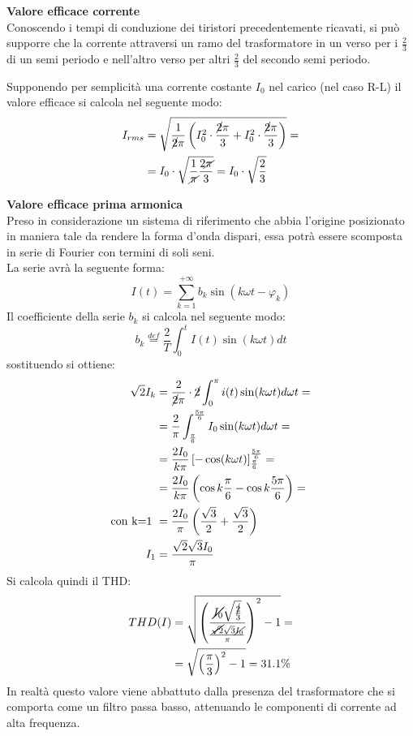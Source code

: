 \documentclass[a4paper,11pt]{article}
\begin{document}
\textbf{Valore efficace corrente}\\
Conoscendo i tempi di conduzione dei tiristori precedentemente ricavati, si può 
supporre che la corrente attraversi un ramo del trasformatore in un verso per i 
\(\frac{2}{3}\) di un semi periodo e nell'altro verso per altri \(\frac{2}{3}\)
del secondo semi periodo.

Supponendo per semplicità una corrente costante \(I_0\) nel carico (nel caso R-L) il valore
efficace si calcola nel seguente modo:
\begin{align*}
 I_{rms} &= \sqrt{\frac{1}{\cancel2\pi}\left(I_0^2\cdot\frac{\cancel2\pi}{3}+I_0^2\cdot
 \frac{\cancel2\pi}{3} \right)}=\\
 &=I_0\cdot\sqrt{\frac{1}{\cancel{\pi}}\frac{2\cancel{\pi}}{3}} = I_0\cdot\sqrt{\frac{2}{3}}
\end{align*}
\smallskip

\textbf{Valore efficace prima armonica}\\
Preso in considerazione un sistema di riferimento che abbia l'origine posizionato
in maniera tale da rendere la forma d'onda dispari, essa potrà essere scomposta
in serie di Fourier con termini di soli seni.\\
La serie avrà la seguente forma:
\begin{equation}
 I(t) = \sum_{k=1}^{+\infty} b_k\sin(k\omega t -\varphi_k)
 \label{eq:serie_fourier}
\end{equation}
Il coefficiente della serie \(b_k\) si calcola nel seguente modo:
\begin{equation}
 b_k \stackrel{def}{=} \frac{2}{T}\int_0^t I(t)\sin(k\omega t) dt
\end{equation}
sostituendo si ottiene:
\begin{align*}
 \sqrt{2}I_k &= \frac{2}{\cancel{2}\pi}\cdot \cancel{2}\int_{0}^{\pi}i(t)\sin(k\omega t) d\omega t =\\
 &=\frac{2}{\pi}\int_{\frac{\pi}{6}}^{\frac{5\pi}{6}}I_0\sin(k\omega t)d\omega t=\\
 &= \frac{2I_0}{k\pi}\left[-\cos(k\omega t)\right]_{\frac{\pi}{6}}^{\frac{5\pi}{6}} =\\
 &=\frac{2I_0}{k\pi}\left(\cos k\frac{\pi}{6}-\cos k\frac{5\pi}{6}\right) =\\
 \text{con k=1 }&= \frac{2I_0}{\pi}\left(\frac{\sqrt{3}}{2} + \frac{\sqrt{3}}{2}  \right) \\
  I_1 &= \frac{\sqrt{2}\sqrt{3}I_0}{\pi}
\end{align*}
Si calcola quindi il THD:
\begin{align*}
 THD(I) &= \sqrt{\left(\frac{\cancel{I_0}\sqrt{\frac{\cancel{2}}{3}}}{\frac{\cancel{\sqrt{2}}\sqrt{3}\cancel{I_0}}{\pi}}\right)^2-1  } = \\
 &= \sqrt{\left(\frac{\pi}{3}  \right)^2 -1 } = 31.1\%
\end{align*}
In realtà questo valore viene abbattuto dalla presenza del trasformatore che si 
comporta come un filtro passa basso, attenuando le componenti di corrente ad alta 
frequenza.
\end{document}
